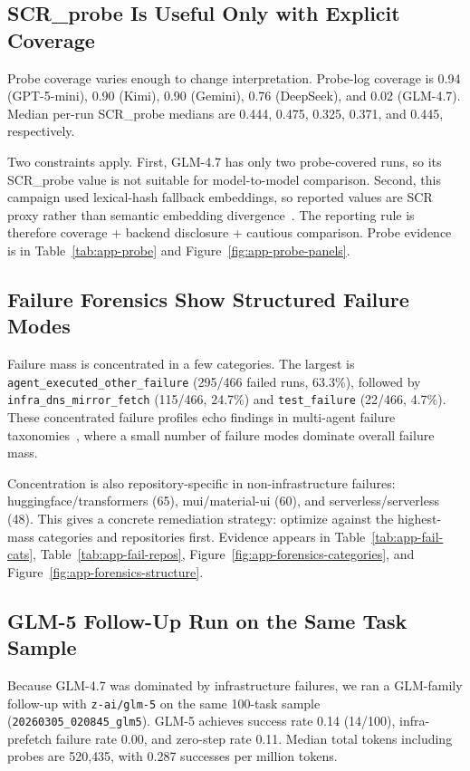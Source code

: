 \documentclass[11pt]{article}
\begin{document}
\subsection{SCR\_probe Is Useful Only with Explicit Coverage}
Probe coverage varies enough to change interpretation. Probe-log coverage is 0.94 (GPT-5-mini), 0.90 (Kimi), 0.90 (Gemini), 0.76 (DeepSeek), and 0.02 (GLM-4.7). Median per-run SCR\_probe medians are 0.444, 0.475, 0.325, 0.371, and 0.445, respectively.

Two constraints apply. First, GLM-4.7 has only two probe-covered runs, so its SCR\_probe value is not suitable for model-to-model comparison. Second, this campaign used lexical-hash fallback embeddings, so reported values are SCR proxy rather than semantic embedding divergence~\cite{Zhou2024Consistency,reimers2019sentencebert}. The reporting rule is therefore coverage + backend disclosure + cautious comparison. Probe evidence is in Table~\ref{tab:app-probe} and Figure~\ref{fig:app-probe-panels}.

\subsection{Failure Forensics Show Structured Failure Modes}
Failure mass is concentrated in a few categories. The largest is \texttt{agent\_executed\_other\_failure} (295/466 failed runs, 63.3\%), followed by \texttt{infra\_dns\_mirror\_fetch} (115/466, 24.7\%) and \texttt{test\_failure} (22/466, 4.7\%). These concentrated failure profiles echo findings in multi-agent failure taxonomies~\cite{tyen2024mast,zhang2024systemfailures}, where a small number of failure modes dominate overall failure mass.

Concentration is also repository-specific in non-infrastructure failures: huggingface/transformers (65), mui/material-ui (60), and serverless/serverless (48). This gives a concrete remediation strategy: optimize against the highest-mass categories and repositories first. Evidence appears in Table~\ref{tab:app-fail-cats}, Table~\ref{tab:app-fail-repos}, Figure~\ref{fig:app-forensics-categories}, and Figure~\ref{fig:app-forensics-structure}.

\subsection{GLM-5 Follow-Up Run on the Same Task Sample}
Because GLM-4.7 was dominated by infrastructure failures, we ran a GLM-family follow-up with \texttt{z-ai/glm-5} on the same 100-task sample (\texttt{20260305\_020845\_glm5}). GLM-5 achieves success rate 0.14 (14/100), infra-prefetch failure rate 0.00, and zero-step rate 0.11. Median total tokens including probes are 520{,}435, with 0.287 successes per million tokens.
\end{document}
